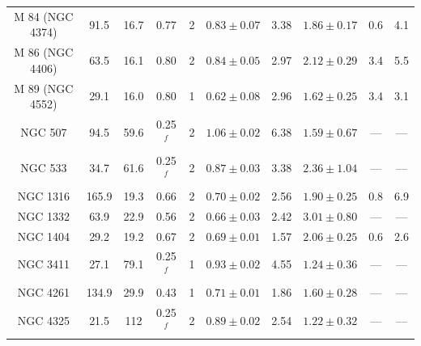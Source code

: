 \documentclass[useAMS,usenatbib]{mn2e}
\begin{document}
\begin{table}
{\begin{tabular}{c c c c c c c c c c}
{{M 84}} (NGC 4374)    &    91.5    &   16.7      &    0.77         &  2    & $ 0.83 \pm 0.07$ & 3.38  & $1.86  \pm 0.17 $ &   0.6   & 4.1        \\      %
{{M 86}} (NGC 4406)    &    63.5    &   16.1      &    0.80         &  2    & $ 0.84 \pm 0.05$ & 2.97  & $2.12  \pm 0.29 $ &   3.4   & 5.5        \\      %
{{M 89}} (NGC 4552)    &    29.1    &   16.0      &    0.80         &  1    & $ 0.62 \pm 0.08$ & 2.96  & $1.62  \pm 0.25 $ &   3.4   & 3.1        \\      %
{{NGC 507}}            &    94.5    &   59.6      &    0.25$^{f}$   &  2    & $ 1.06 \pm 0.02$ & 6.38  & $1.59  \pm 0.67 $ &   ---   & ---        \\     %
{{NGC 533}}            &    34.7    &   61.6      &    0.25$^{f}$   &  2    & $ 0.87 \pm 0.03$ & 3.38  & $2.36  \pm 1.04 $ &   ---   & ---        \\      %
{{NGC 1316}}           &   165.9    &   19.3      &    0.66         &  2    & $ 0.70 \pm 0.02$ & 2.56  & $1.90  \pm 0.25 $ &   0.8   & 6.9        \\     %
{{NGC 1332}}           &    63.9    &   22.9      &    0.56         &  2    & $ 0.66 \pm 0.03$ & 2.42  & $3.01  \pm 0.80 $ &   ---   & ---        \\     %
{{NGC 1404}}           &    29.2    &   19.2      &    0.67         &  2    & $ 0.69 \pm 0.01$ & 1.57  & $2.06  \pm 0.25 $ &   0.6   & 2.6        \\     %
{{NGC 3411}}           &    27.1    &   79.1      &    0.25$^{f}$   &  1    & $ 0.93 \pm 0.02$ & 4.55  & $1.24  \pm 0.36 $ &   ---   & ---        \\      %
{{NGC 4261}}           &   134.9    &   29.9      &    0.43         &  1    & $ 0.71 \pm 0.01$ & 1.86  & $1.60  \pm 0.28 $ &   ---   & ---        \\      %
{{NGC 4325}}           &    21.5    &    112      &    0.25$^{f}$   &  2    & $ 0.89 \pm 0.02$ & 2.54  & $1.22  \pm 0.32 $ &   ---   & ---        \\     %

\end{tabular}}
\end{table}
\end{document}
